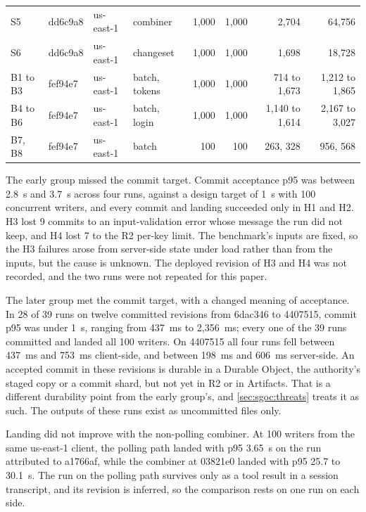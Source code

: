 \documentclass[11pt,letterpaper]{article}
\theoremstyle{definition}
\theoremstyle{remark}
\begin{document}
\begin{table}[t]
\begin{tabular}{@{}llllrrrr@{}}
S5 & dd6c9a8 & us-east-1 & combiner & 1,000 & 1,000 & 2,704 & 64,756 \\ %
S6 & dd6c9a8 & us-east-1 & changeset & 1,000 & 1,000 & 1,698 & 18,728 \\ %
\midrule
B1 to B3 & fef94e7 & us-east-1 & batch, tokens & 1,000 & 1,000 & 714 to 1,673 & 1,212 to 1,865 \\ %
B4 to B6 & fef94e7 & us-east-1 & batch, login & 1,000 & 1,000 & 1,140 to 1,614 & 2,167 to 3,027 \\ %
B7, B8 & fef94e7 & us-east-1 & batch & 100 & 100 & 263, 328 & 956, 568 \\ %
\bottomrule
\end{tabular}
\end{table}

The early group missed the commit target. Commit acceptance p95 was between 2.8~s and 3.7~s across four runs, against a design target of 1~s with 100 concurrent writers, and every commit and landing succeeded only in H1 and H2. %
H3 lost 9 commits to an input-validation error whose message the run did not keep, and H4 lost 7 to the R2 per-key limit. %
The benchmark's inputs are fixed, so the H3 failures arose from server-side state under load rather than from the inputs, but the cause is unknown. The deployed revision of H3 and H4 was not recorded, and the two runs were not repeated for this paper.

The later group met the commit target, with a changed meaning of acceptance. In 28 of 39 runs on twelve committed revisions from 6dac346 to 4407515, commit p95 was under 1~s, ranging from 437~ms to 2,356~ms; every one of the 39 runs committed and landed all 100 writers. %
On 4407515 all four runs fell between 437~ms and 753~ms client-side, and between 198~ms and 606~ms server-side. %
An accepted commit in these revisions is durable in a Durable Object, the authority's staged copy or a commit shard, but not yet in R2 or in Artifacts. That is a different durability point from the early group's, and \cref{sec:sgoc:threats} treats it as such. The outputs of these runs exist as uncommitted files only.

Landing did not improve with the non-polling combiner. At 100 writers from the same us-east-1 client, the polling path landed with p95 3.65~s on the run attributed to a1766af, while the combiner at 03821e0 landed with p95 25.7 to 30.1~s. %
The run on the polling path survives only as a tool result in a session transcript, and its revision is inferred, so the comparison rests on one run on each side.
\end{document}
